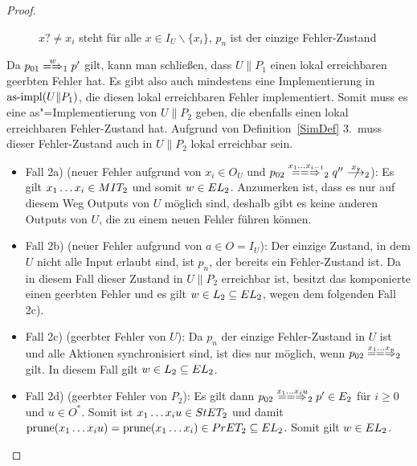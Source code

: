 \begin{proof}
\begin{itemize}
\begin{figure} [h!tbp]
\begin{center}
        \caption{$x?\neq x_i$ steht für alle $x\in I_U\backslash\{x_i\}$, $p_n$
          ist der einzige Fehler-Zustand}
      \label{UmitE}
      \end{center}
      \end{figure}
      Da $p_{01}\weakmay[w]_1p'$ gilt, kann man schließen, dass $U\|P_1$ einen
      lokal erreichbaren geerbten Fehler hat. Es gibt also auch mindestens eine
      Implementierung in $\mathrm{as}\text{-}\mathrm{impl} (U\|P_1)$, die diesen lokal erreichbaren
      Fehler implementiert. Somit muss es eine as"=Implementierung von $U\|P_2$
      geben, die ebenfalls einen lokal erreichbaren Fehler-Zustand hat.
      Aufgrund von Definition~\ref{SimDef} 3.\ muss dieser Fehler-Zustand auch
      in $U\|P_2$ lokal erreichbar sein.
      \begin{itemize}
        \item Fall 2a) (neuer Fehler aufgrund von $x_i\in O_U$ und $p_{02}
          \lweakmay[x_1\dots x_{i-1}]_2q''\nmust[x_i]_2$): Es gilt $x_1\dots
          x_i\in MIT _2$ und somit $w\in EL_2$. Anzumerken ist, dass es nur
          auf diesem Weg Outputs von $U$ möglich sind, deshalb gibt es keine
          anderen Outputs von $U$, die zu einem neuen Fehler führen können.
        \item Fall 2b) (neuer Fehler aufgrund von $a\in O=I_U$): Der einzige
          Zustand, in dem $U$ nicht alle Input erlaubt sind, ist $p_n$, der
          bereits ein Fehler-Zustand ist. Da in diesem Fall dieser Zustand in
          $U\|P_2$ erreichbar ist, besitzt das komponierte \MEIO{} einen
          geerbten Fehler und es gilt $w\in L_2\subseteq EL _2$, wegen dem
          folgenden Fall 2c).
        \item Fall 2c) (geerbter Fehler von $U$): Da $p_n$ der einzige
          Fehler-Zustand in $U$ ist und alle Aktionen synchronisiert sind, ist
          dies nur möglich, wenn $p_{02} \lweakmay[x_1\dots x_n]_2$ gilt. In
          diesem Fall gilt $w\in L_2\subseteq EL _2$.
        \item Fall 2d) (geerbter Fehler von $P_2$): Es gilt dann $p_{02}
          \lweakmay[x_1\dots x_iu]_2 p'\in E_2$ für $i\geq 0$ und $u\in O^*$.
          Somit ist $x_1\dots x_iu\in StET _2$ und damit $\mathrm{prune} (x_1\dots
          x_iu) =\mathrm{prune} (x_1\dots x_i)\in PrET _2\subseteq EL _2$. Somit gilt
          $w\in EL _2$.
      \end{itemize}
  \end{itemize}
\end{proof}

